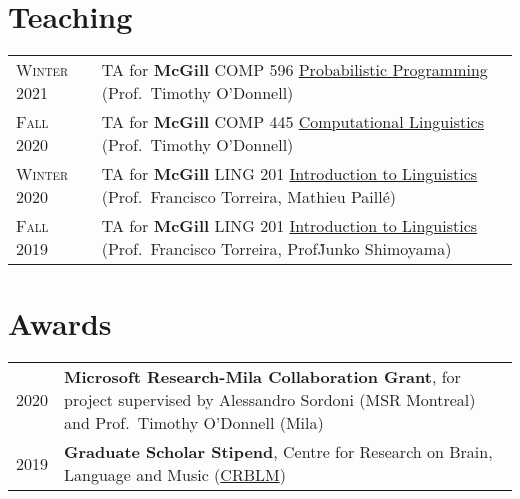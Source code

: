 \documentclass[11pt,a4paper]{article}
\begin{document}


  \section{Teaching}
  \begin{longtable}{p{2cm}|p{14.5cm}}
    \textsc{Winter 2021}&%
      TA for \textbf{McGill} COMP 596 \uline{Probabilistic Programming}
      (Prof.\ Timothy O'Donnell)\\
    \textsc{Fall 2020}&%
      TA for \textbf{McGill} COMP 445 \uline{Computational Linguistics}
      (Prof.\ Timothy O'Donnell)\\
    \textsc{Winter 2020}&%
      TA for \textbf{McGill} LING 201 \uline{Introduction to Linguistics}
      (Prof.\ Francisco Torreira, Mathieu Paillé)\\
    \textsc{Fall 2019}&%
      TA for \textbf{McGill} LING 201 \uline{Introduction to Linguistics}
      (Prof.\ Francisco Torreira, Prof\. Junko Shimoyama)\\
  \end{longtable}

  \section{Awards}
  \begin{longtable}{p{2cm}|p{14.5cm}}
    \textsc{2020}&%
      \textbf{Microsoft Research-Mila Collaboration Grant}, for project
      supervised by Alessandro Sordoni (MSR Montreal) and Prof.\ Timothy
      O'Donnell (Mila)\\
    \textsc{2019}&%
      \textbf{Graduate Scholar Stipend}, Centre for Research on Brain, Language
      and Music (\href{https://crblm.ca/}{CRBLM})\\
  \end{longtable}
\end{document}
